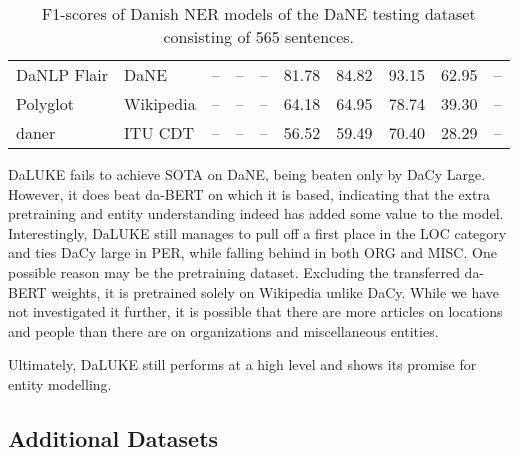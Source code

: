 \documentclass[main.tex]{subfiles}
\begin{document}
\begin{table}[H]
\begin{center}
\begin{tabular}{l l | c c c c | c c c c}
                        DaNLP Flair   & DaNE      & --             & --             & --             & 81.78                        & 84.82          & 93.15          & 62.95          & -- \\
                        Polyglot      & Wikipedia & --             & --             & --             & 64.18                        & 64.95          & 78.74          & 39.30          & -- \\
                        daner         & ITU CDT   & --             & --             & --             & 56.52                        & 59.49          & 70.40          & 28.29          & -- \\
                \end{tabular}
        \end{center}
        \caption{F1\pro-scores of Danish NER models of the DaNE testing dataset consisting of 565 sentences.}
        \label{tab:DaNE}
\end{table}\noindent
DaLUKE fails to achieve SOTA on DaNE, being beaten only by DaCy Large.
However, it does beat da-BERT on which it is based, indicating that the extra pretraining and entity understanding indeed has added some value to the model.
Interestingly, DaLUKE still manages to pull off a first place in the LOC category and ties DaCy large in PER, while falling behind in both ORG and MISC.
One possible reason may be the pretraining dataset.
Excluding the transferred da-BERT weights, it is pretrained solely on Wikipedia unlike DaCy.
While we have not investigated it further, it is possible that there are more articles on locations and people than there are on organizations and miscellaneous entities.

Ultimately, DaLUKE still performs at a high level and shows its promise for entity modelling.

\subsection{Additional Datasets}


\end{document}
